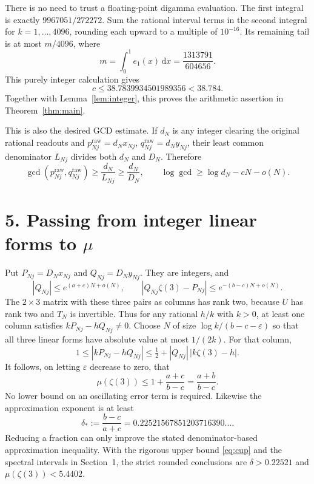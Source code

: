 \documentclass[11pt]{article}
\newcommand{\dd}{\mathrm d}
\newcommand{\z}{\zeta(3)}
\begin{document}
There is no need to trust a floating-point digamma evaluation. The first
integral is exactly $9967051/272272$. Sum the rational interval terms in
the second integral for $k=1,\ldots,4096$, rounding each upward to a multiple
of $10^{-16}$. Its remaining tail is at most $m/4096$, where
\[
 m=\int_0^1e_1(x)\,\dd x=\frac{1313791}{604656}.
\]
This purely integer calculation gives
\begin{equation}\label{eq:cup}
 c\le38.7839934501989356<38.784.
\end{equation}
Together with Lemma~\ref{lem:integer}, this proves the arithmetic assertion
in Theorem~\ref{thm:main}.

This is also the desired GCD estimate. If $d_N$ is any integer clearing the
original rational readouts and $p_{Nj}^{\mathrm{raw}}=d_Nx_{Nj}$,
$q_{Nj}^{\mathrm{raw}}=d_Ny_{Nj}$, their least common denominator $L_{Nj}$
divides both $d_N$ and $D_N$. Therefore
\[
 \gcd(p_{Nj}^{\mathrm{raw}},q_{Nj}^{\mathrm{raw}})
 \ge\frac{d_N}{L_{Nj}}\ge\frac{d_N}{D_N},\qquad
 \log\gcd\ge\log d_N-cN-o(N).
\]

\section*{5. Passing from integer linear forms to $\mu$}
Put $P_{Nj}=D_Nx_{Nj}$ and $Q_{Nj}=D_Ny_{Nj}$. They are integers, and
\[
 |Q_{Nj}|\le e^{(a+c)N+o(N)},\qquad
 |Q_{Nj}\z-P_{Nj}|\le e^{-(b-c)N+o(N)}.
\]
The $2\times3$ matrix with these three pairs as columns has rank two,
because $U$ has rank two and $T_N$ is invertible. Thus for any rational
$h/k$ with $k>0$, at least one column satisfies
$kP_{Nj}-hQ_{Nj}\ne0$.
Choose $N$ of size $\log k/(b-c-\varepsilon)$ so that all three linear
forms have absolute value at most $1/(2k)$. For that column,
\[
 1\le |kP_{Nj}-hQ_{Nj}|
 \le\tfrac12+|Q_{Nj}|\,|k\z-h|.
\]
It follows, on letting $\varepsilon$ decrease to zero, that
\begin{equation}\label{eq:mu}
 \mu(\zeta(3))\le1+\frac{a+c}{b-c}
       =\frac{a+b}{b-c}.
\end{equation}
No lower bound on an oscillating error term is required.
Likewise the approximation exponent is at least
\[
 \delta_*:=\frac{b-c}{a+c}
       =0.22521567851203716390\ldots.
\]
Reducing a fraction can only improve the stated denominator-based
approximation inequality. With the rigorous upper bound
\eqref{eq:cup} and the spectral intervals in Section~1, the strict rounded
conclusions are $\delta>0.22521$ and $\mu(\zeta(3))<5.4402$.
\end{document}
